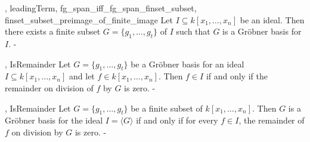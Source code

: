 \begin{lemma}\label{monomial_not_mem_leading_term_ideal}


\end{lemma}

\begin{lemma}\label{term_not_mem_leading_term_ideal}


\end{lemma}

\begin{lemma}\label{not_mem_leading_term_ideal}


\end{lemma}

\begin{lemma}\label{exists_groebner_basis}
  \leanok
  ,
{leadingTerm},
{fg_span_iff_fg_span_finset_subset},
{finset_subset_preimage_of_finite_image}
  Let \( I \subseteq k[x_1, \ldots, x_n] \) be an ideal. Then there exists a finite subset \( G = \{g_1, \ldots, g_t\} \) of \( I \) such that \( G \) is a Gröbner basis for \( I \).
-
\end{lemma}

\begin{lemma}\label{groebner_basis_isRemainder_zero_iff_mem_span}

  ,
{IsRemainder}
  Let \( G = \{g_1, \dots, g_t\} \) be a Gröbner basis for an ideal \( I \subseteq k[x_1, \dots, x_n] \) and let \( f \in k[x_1, \dots, x_n] \). Then \( f \in I \) if and only if the remainder on division of \( f \) by \( G \) is zero.
-
\end{lemma}

\begin{lemma}\label{is_groebner_basis_iff}

  ,
{IsRemainder}
  Let \( G = \{g_1, \ldots, g_t\} \) be a finite subset of \( k[x_1, \ldots, x_n] \). Then \( G \) is a Gröbner basis for the ideal \( I = \langle G \rangle \) if and only if  for every \( f \in I \), the remainder of \( f \) on division by \( G \) is zero.
-
\end{lemma}

